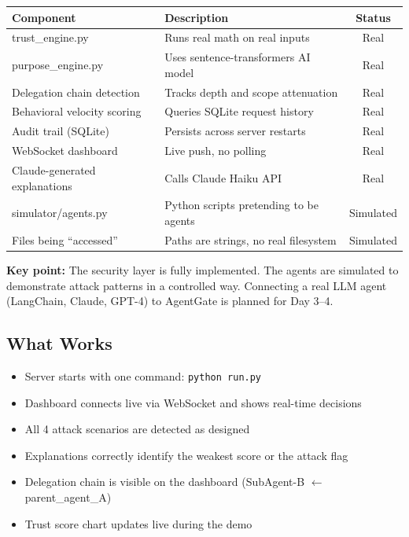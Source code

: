\documentclass[12pt, a4paper]{article}
\begin{document}
\vspace{0.3cm}
\begin{tabularx}{\textwidth}{>{\ttfamily\small}l X c}
  \toprule
  \normalfont\textbf{Component} & \textbf{Description} & \textbf{Status} \\
  \midrule
  trust\_engine.py & Runs real math on real inputs & \textcolor{permitgreen}{Real} \\
  purpose\_engine.py & Uses sentence-transformers AI model & \textcolor{permitgreen}{Real} \\
  Delegation chain detection & Tracks depth and scope attenuation & \textcolor{permitgreen}{Real} \\
  Behavioral velocity scoring & Queries SQLite request history & \textcolor{permitgreen}{Real} \\
  Audit trail (SQLite) & Persists across server restarts & \textcolor{permitgreen}{Real} \\
  WebSocket dashboard & Live push, no polling & \textcolor{permitgreen}{Real} \\
  Claude-generated explanations & Calls Claude Haiku API & \textcolor{permitgreen}{Real} \\
  \midrule
  simulator/agents.py & Python scripts pretending to be agents & \textcolor{escalateyellow}{Simulated} \\
  Files being ``accessed'' & Paths are strings, no real filesystem & \textcolor{escalateyellow}{Simulated} \\
  \bottomrule
\end{tabularx}
\vspace{0.3cm}

\textbf{Key point:} The security layer is fully implemented. The agents are simulated
to demonstrate attack patterns in a controlled way. Connecting a real LLM agent
(LangChain, Claude, GPT-4) to AgentGate is planned for Day 3--4.

\subsection{What Works}

\begin{itemize}[noitemsep]
  \item Server starts with one command: \texttt{python run.py}
  \item Dashboard connects live via WebSocket and shows real-time decisions
  \item All 4 attack scenarios are detected as designed
  \item Explanations correctly identify the weakest score or the attack flag
  \item Delegation chain is visible on the dashboard (SubAgent-B $\leftarrow$ parent\_agent\_A)
  \item Trust score chart updates live during the demo
\end{itemize}
\end{document}
